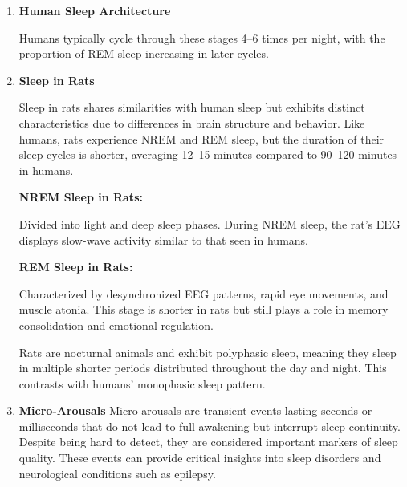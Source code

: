 \documentclass[a4paper,12pt,twoside]{article}
\begin{document}
\begin{enumerate}
    \item \textbf{Human Sleep Architecture}
    
    Humans typically cycle through these stages 4–6 times per night, with the proportion of REM sleep increasing in later cycles.
    
    \item \textbf{Sleep in Rats}
    
    Sleep in rats shares similarities with human sleep but exhibits distinct characteristics due to differences in brain structure and behavior. Like humans, rats experience NREM and REM sleep, but the duration of their sleep cycles is shorter, averaging 12–15 minutes compared to 90–120 minutes in humans.
    
            \textbf{NREM Sleep in Rats:}
    
            Divided into light and deep sleep phases. During NREM sleep, the rat’s EEG displays slow-wave activity similar to that seen in humans.
    
            \textbf{REM Sleep in Rats:}
    
            Characterized by desynchronized EEG patterns, rapid eye movements, and muscle atonia. This stage is shorter in rats but still plays a role in memory consolidation and emotional regulation.
    
    Rats are nocturnal animals and exhibit polyphasic sleep, meaning they sleep in multiple shorter periods distributed throughout the day and night. This contrasts with humans' monophasic sleep pattern.
        
    \item \textbf{Micro-Arousals}
            Micro-arousals are transient events lasting seconds or milliseconds that do not lead to full awakening but interrupt sleep continuity. Despite being hard to detect, they are considered important markers of sleep quality. These events can provide critical insights into sleep disorders and neurological conditions such as epilepsy.
    \end{enumerate}
\end{document}
